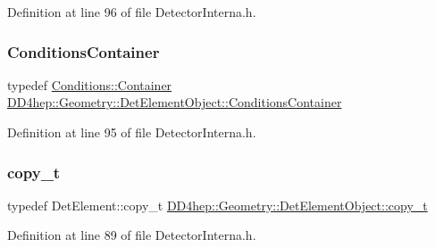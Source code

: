 Definition at line 96 of file Detector\+Interna.\+h.

\hypertarget{class_d_d4hep_1_1_geometry_1_1_det_element_object_a01728952c7dd2f2c102e2a1ae25b80ff}{}\label{class_d_d4hep_1_1_geometry_1_1_det_element_object_a01728952c7dd2f2c102e2a1ae25b80ff} 
\subsubsection{\texorpdfstring{Conditions\+Container}{ConditionsContainer}}
{\footnotesize\ttfamily typedef \hyperlink{class_d_d4hep_1_1_conditions_1_1_container}{Conditions\+::\+Container} \hyperlink{class_d_d4hep_1_1_geometry_1_1_det_element_object_a01728952c7dd2f2c102e2a1ae25b80ff}{D\+D4hep\+::\+Geometry\+::\+Det\+Element\+Object\+::\+Conditions\+Container}}



Definition at line 95 of file Detector\+Interna.\+h.

\hypertarget{class_d_d4hep_1_1_geometry_1_1_det_element_object_a2780058563d2399014b51afa789ebd21}{}\label{class_d_d4hep_1_1_geometry_1_1_det_element_object_a2780058563d2399014b51afa789ebd21} 
\subsubsection{\texorpdfstring{copy\+\_\+t}{copy\_t}}
{\footnotesize\ttfamily typedef Det\+Element\+::copy\+\_\+t \hyperlink{class_d_d4hep_1_1_geometry_1_1_det_element_object_a2780058563d2399014b51afa789ebd21}{D\+D4hep\+::\+Geometry\+::\+Det\+Element\+Object\+::copy\+\_\+t}}



Definition at line 89 of file Detector\+Interna.\+h.

\hypertarget{class_d_d4hep_1_1_geometry_1_1_det_element_object_af4773c2a725fc7076297670a7ae1ac41}{}\label{class_d_d4hep_1_1_geometry_1_1_det_element_object_af4773c2a725fc7076297670a7ae1ac41} 
